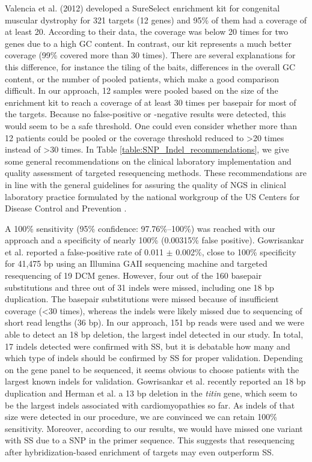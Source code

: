 \noindent Valencia et al. (2012)\cite{Valencia_2012} developed a SureSelect enrichment kit for congenital muscular dystrophy for 321 targets (12 genes) and 95\% of them had a coverage of at least 20. 
According to their data, the coverage was below 20 times for two genes due to a high GC content. 
In contrast, our kit represents a much better coverage (99\% covered more than 30 times). 
There are several explanations for this difference, for instance the tiling of the baits, differences in the overall GC content, or the number of pooled patients, which make a good comparison difficult. 
In our approach, 12 samples were pooled based on the size of the enrichment kit to reach a coverage of at least 30 times per basepair for most of the targets. 
Because no false-positive or -negative results were detected, this would seem to be a safe threshold. One could even consider whether more than 12 patients could be pooled or the coverage threshold reduced to {\textgreater}20 times instead of {\textgreater}30 times. 
In Table \ref{table:SNP_Indel_recommendations}, we give some general recommendations on the clinical laboratory implementation and quality assessment of targeted resequencing methods. 
These recommendations are in line with the general guidelines for assuring the quality of NGS in clinical laboratory practice formulated by the national workgroup of the US Centers for Disease Control and Prevention \cite{Gargis_2012}.

A 100\% sensitivity (95\% confidence: 97.76\%–100\%) was reached with our approach and a specificity of nearly 100\% (0.00315\% false positive). 
Gowrisankar et al. \cite{Gowrisankar_2010} reported a false-positive rate of 0.011 $\pm$ 0.002\%, close to 100\% specificity for 41,475 bp using an Illumina GAII sequencing machine and targeted resequencing of 19 DCM genes. 
However, four out of the 160 basepair substitutions and three out of 31 indels were missed, including one 18 bp duplication. 
The basepair substitutions were missed because of insufficient coverage ({\textless}30 times), whereas the indels were likely missed due to sequencing of short read lengths (36 bp). 
In our approach, 151 bp reads were used and we were able to detect an 18 bp deletion, the largest indel detected in our study. 
In total, 17 indels detected were confirmed with SS, but it is debatable how many and which type of indels should be confirmed by SS for proper validation. 
Depending on the gene panel to be sequenced, it seems obvious to choose patients with the largest known indels for validation. 
Gowrisankar et al. \cite{Gowrisankar_2010} recently reported an 18 bp duplication and Herman et al. \cite{Herman_2012} a 13 bp deletion in the \textsl{titin} gene, which seem to be the largest indels associated with cardiomyopathies so far. 
As indels of that size were detected in our procedure, we are convinced we can retain 100\% sensitivity. 
Moreover, according to our results, we would have missed one variant with SS due to a SNP in the primer sequence. 
This suggests that resequencing after hybridization-based enrichment of targets may even outperform SS. 

